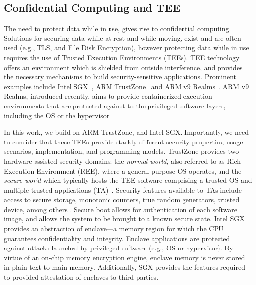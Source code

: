 
\subsection{Confidential Computing and TEE}

The need to protect data while in use, gives rise to confidential computing. Solutions for securing data while at rest and while moving, exist and are often used (e.g., TLS, and File Disk Encryption), however protecting data while in use requires the use of Trusted Execution Environments (TEEs).
TEE technology offers an environment which is shielded from outside interference, and provides the necessary mechanisms %
to build security-sensitive applications. Prominent examples include Intel SGX~\cite{intelsgx}, ARM TrustZone~\cite{armtz} and ARM v9 Realms~\cite{arm-realm}. ARM v9 Realms, introduced recently, aims to provide containerized execution environments that are protected against to the privileged software layers, including the OS or the hypervisor.

In this work, we build on ARM TrustZone, and Intel SGX. Importantly, we need to consider that these TEEs provide starkly different security properties, usage scenarios, implementation, and programming models. TrustZone provides two hardware-assisted security domains: the \textit{normal world}, also referred to as Rich Execution Environment (REE), where a general purpose OS operates, and the \textit{secure world} which typically hosts the TEE software comprising a trusted OS and multiple trusted applications (TA)~\cite{armtz}. 
Security features available to TAs include access to secure storage, monotonic counters, true random generators, trusted device, among others \cite{tee-gp}. Secure boot allows for authentication of each software image, and allows the system to be brought to a known secure state. Intel SGX provides an abstraction of enclave---a memory region for which the CPU guarantees confidentiality and integrity. Enclave applications are protected against attacks launched by privileged software (e.g., OS or hypervisor). By virtue of an on-chip memory encryption engine, enclave memory is never stored in plain text to main memory. Additionally, SGX provides the features required to provided attestation of enclaves to third parties.


